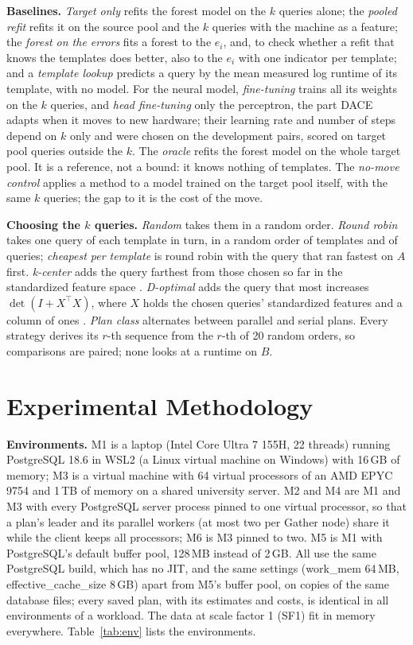 \documentclass[conference]{IEEEtran}
\begin{document}
\textbf{Baselines.} \emph{Target only} refits the forest model on the $k$
queries alone; the \emph{pooled refit} refits it on the source pool and the
$k$ queries with the machine as a feature; the \emph{forest on the errors}
fits a forest to the $e_i$, and, to check whether a refit that knows the
templates does better, also to the $e_i$ with one indicator per template; and a \emph{template lookup} predicts a query by
the mean measured log runtime of its template, with no model. For the
neural model, \emph{fine-tuning} trains all its weights on the $k$ queries,
and \emph{head fine-tuning} only the perceptron, the part DACE adapts when
it moves to new hardware; their learning rate and number of steps depend on
$k$ only and were chosen on the development pairs, scored on target pool
queries outside the $k$. The \emph{oracle} refits the forest model on
the whole target pool. It is a reference, not a bound: it knows nothing of
templates. The \emph{no-move control} applies a method to a model trained
on the target pool itself, with the same $k$ queries; the gap to it is the
cost of the move.

\textbf{Choosing the $k$ queries.} \emph{Random} takes them in a random
order. \emph{Round robin} takes one query of each template in turn, in a
random order of templates and of queries; \emph{cheapest per template} is
round robin with the query that ran fastest on $A$ first. \emph{k-center}
adds the query farthest from those chosen so far in the standardized
feature space \cite{gonzalez1985,sener2018}. \emph{D-optimal} adds the query
that most increases $\det(I + X^\top X)$, where $X$ holds the chosen
queries' standardized features and a column of ones
\cite{wynn1970,mitchell1974}. \emph{Plan class} alternates between parallel
and serial plans. Every strategy derives its $r$-th sequence from the $r$-th
of 20 random orders, so comparisons are paired; none looks at a runtime on
$B$.

\section{Experimental Methodology}
\label{sec:setup}

\textbf{Environments.} M1 is a laptop (Intel Core Ultra 7 155H, 22
threads) running PostgreSQL 18.6 in WSL2 (a Linux virtual machine on
Windows) with 16\,GB of memory; M3 is a virtual machine with 64 virtual
processors of an AMD EPYC 9754 and 1\,TB of memory on a shared university
server. M2 and M4 are M1 and M3 with every PostgreSQL server process pinned
to one virtual processor, so that a plan's leader and its parallel workers
(at most two per Gather node) share it while the client keeps all
processors; M6 is M3 pinned to two. M5 is M1 with PostgreSQL's default
buffer pool, 128\,MB instead of 2\,GB. All use the same PostgreSQL build,
which has no JIT, and the same settings (work\_mem 64\,MB,
effective\_cache\_size 8\,GB) apart from M5's buffer pool, on copies of the
same database files; every saved plan, with its estimates and costs, is
identical in all environments of a workload. The data at scale factor 1
(SF1) fit in memory everywhere. Table~\ref{tab:env} lists the environments.
\end{document}
